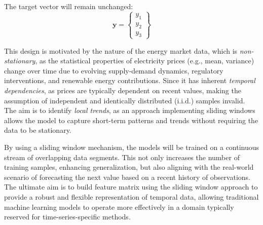 \documentclass[12pt]{report} %
\begin{document}
The target vector will remain unchanged:
\begin{equation*}
\mathbf{y} = \begin{Bmatrix}
y_1 \\
y_2 \\
y_3
\end{Bmatrix}
\end{equation*}

This design is motivated by the nature of the energy market data, which is \textit{non-stationary}, as the statistical properties of electricity prices (e.g., mean, variance) change over time due to evolving supply-demand dynamics, regulatory interventions, and renewable energy contributions. Since it has inherent \textit{temporal dependencies}, as prices are typically dependent on recent values, making the assumption of independent and identically distributed (i.i.d.) samples invalid. The aim is to identify \textit{local trends}, as an approach implementing sliding windows allows the model to capture short-term patterns and trends without requiring the data to be stationary.

By using a sliding window mechanism, the models will be trained on a continuous stream of overlapping data segments. This not only increases the number of training samples, enhancing generalization, but also aligning with the real-world scenario of forecasting the next value based on a recent history of observations. The ultimate aim is to build feature matrix using the sliding window approach to provide a robust and flexible representation of temporal data, allowing traditional machine learning models to operate more effectively in a domain typically reserved for time-series-specific methods.



\end{document}
